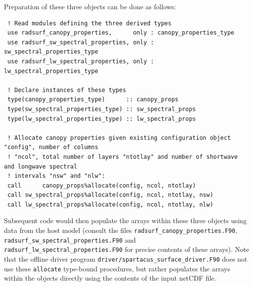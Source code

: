\documentclass[a4,oneside]{article}
\def\codesize{\small}
\def\code#1{{\codesize\texttt{#1}}}
\begin{document}
Preparation of these three objects can be done as follows:
%
\begin{lstlisting}
 ! Read modules defining the three derived types
 use radsurf_canopy_properties,      only : canopy_properties_type
 use radsurf_sw_spectral_properties, only : sw_spectral_properties_type
 use radsurf_lw_spectral_properties, only : lw_spectral_properties_type

 ! Declare instances of these types
 type(canopy_properties_type)      :: canopy_props
 type(sw_spectral_properties_type) :: sw_spectral_props
 type(lw_spectral_properties_type) :: lw_spectral_props

 ! Allocate canopy properties given existing configuration object "config", number of columns 
 ! "ncol", total number of layers "ntotlay" and number of shortwave and longwave spectral
 ! intervals "nsw" and "nlw":
 call      canopy_props%allocate(config, ncol, ntotlay)
 call sw_spectral_props%allocate(config, ncol, ntotlay, nsw)
 call lw_spectral_props%allocate(config, ncol, ntotlay, nlw)
\end{lstlisting}
Subsequent code would then populate the arrays within these three
objects using data from the host model (consult the files
\code{radsurf\_canopy\_properties.F90},
\code{radsurf\_sw\_spectral\_properties.F90} and
\code{radsurf\_lw\_spectral\_properties.F90} for precise contents of
these arrays).  Note that the offline driver program
\code{driver/spartacus\_surface\_driver.F90} does not use these
\code{allocate} type-bound procedures, but rather populates the arrays
within the objects directly using the contents of the input netCDF
file.
\end{document}
